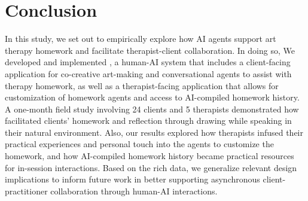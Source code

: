 \section{Conclusion}
In this study, we set out to empirically explore how AI agents support art therapy homework and facilitate therapist-client collaboration. In doing so, We developed and implemented \name{}, a human-AI system that includes a client-facing application for co-creative art-making and conversational agents to assist with therapy homework, as well as a therapist-facing application that allows for customization of homework agents and access to AI-compiled homework history. A one-month field study involving 24 clients and 5 therapists demonstrated how \name{} facilitated clients' homework and reflection through drawing while speaking in their natural environment.
Also, our results explored how therapists infused their practical experiences and personal touch into the agents to customize the homework, and how AI-compiled homework history became practical resources for in-session interactions.
Based on the rich data, we generalize relevant design implications to inform future work in better supporting asynchronous client-practitioner collaboration through human-AI interactions.



